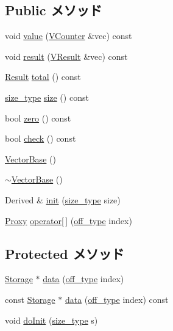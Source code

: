 \subsection*{Public メソッド}
\begin{DoxyCompactItemize}
\item 
void \hyperlink{classStats_1_1VectorBase_a0f4f8268e03f31887e29f7b5bb8fd9fe}{value} (\hyperlink{classstd_1_1vector}{VCounter} \&vec) const 
\item 
void \hyperlink{classStats_1_1VectorBase_a9dff2394cecff3afb2bf8662c9c9bc04}{result} (\hyperlink{classstd_1_1vector}{VResult} \&vec) const 
\item 
\hyperlink{namespaceStats_ad874d2cfd4b4a29ebd480bb2e67f20ae}{Result} \hyperlink{classStats_1_1VectorBase_a35c6e2ed3fc81b40d69052a062113ead}{total} () const 
\item 
\hyperlink{namespaceStats_ada51e68d31936547d3729c82daf6b7c6}{size\_\-type} \hyperlink{classStats_1_1VectorBase_a503ab01f6c0142145d3434f6924714e7}{size} () const 
\item 
bool \hyperlink{classStats_1_1VectorBase_a4e72b01b727d3165e75cba84eb507491}{zero} () const 
\item 
bool \hyperlink{classStats_1_1VectorBase_a6ecddb2c44556b7acbc1723a968ff8bb}{check} () const 
\item 
\hyperlink{classStats_1_1VectorBase_a146b52fc4bf3790ed55a6c097ca3e76b}{VectorBase} ()
\item 
\hyperlink{classStats_1_1VectorBase_a12114a53f6c0a8f17deeb0dc6a208b67}{$\sim$VectorBase} ()
\item 
Derived \& \hyperlink{classStats_1_1VectorBase_ae41cad1a02eeb7958df026d8e2cc7582}{init} (\hyperlink{namespaceStats_ada51e68d31936547d3729c82daf6b7c6}{size\_\-type} size)
\item 
\hyperlink{classStats_1_1ScalarProxy}{Proxy} \hyperlink{classStats_1_1VectorBase_ad22583203a39f3bb11549cc89ba71e9d}{operator\mbox{[}$\,$\mbox{]}} (\hyperlink{namespaceStats_a2773c9fa9e4b0b04a46b37494b44842a}{off\_\-type} index)
\end{DoxyCompactItemize}
\subsection*{Protected メソッド}
\begin{DoxyCompactItemize}
\item 
\hyperlink{classStats_1_1VectorBase_a5d4a6db0e7c32292f54a08d05c671bd1}{Storage} $\ast$ \hyperlink{classStats_1_1VectorBase_ad9077db0c8f34051d2e7766c947aa7b2}{data} (\hyperlink{namespaceStats_a2773c9fa9e4b0b04a46b37494b44842a}{off\_\-type} index)
\item 
const \hyperlink{classStats_1_1VectorBase_a5d4a6db0e7c32292f54a08d05c671bd1}{Storage} $\ast$ \hyperlink{classStats_1_1VectorBase_a53a38df6a99d518a4016d9635235cc44}{data} (\hyperlink{namespaceStats_a2773c9fa9e4b0b04a46b37494b44842a}{off\_\-type} index) const 
\item 
void \hyperlink{classStats_1_1VectorBase_a66947ebf8d14cd3e1f7bfc4c5b4227f4}{doInit} (\hyperlink{namespaceStats_ada51e68d31936547d3729c82daf6b7c6}{size\_\-type} s)
\end{DoxyCompactItemize}
